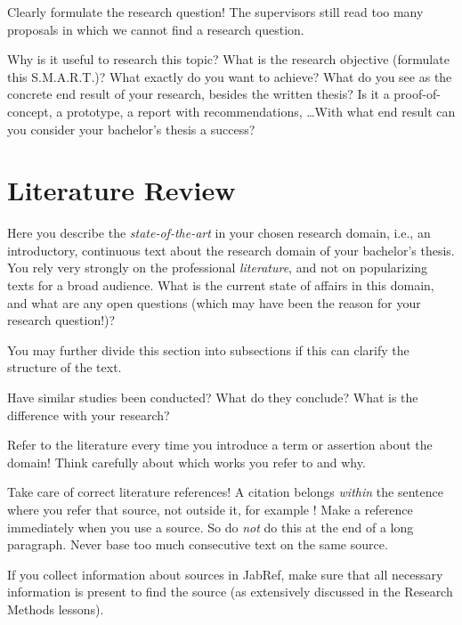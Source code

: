 \documentclass[english]{hogent-article}
\begin{document}
Clearly formulate the research question! The supervisors still read too many proposals in which we cannot find a research question.

Why is it useful to research this topic? What is the research objective (formulate this S.M.A.R.T.)? What exactly do you want to achieve? What do you see as the concrete end result of your research, besides the written thesis? Is it a proof-of-concept, a prototype, a report with recommendations, \ldots With what end result can you consider your bachelor's thesis a success?

\section{Literature Review}%
\label{sec:literature review}


Here you describe the \emph{state-of-the-art} in your chosen research domain, i.e., an introductory, continuous text about the research domain of your bachelor's thesis. You rely very strongly on the professional \emph{literature}, and not on popularizing texts for a broad audience. What is the current state of affairs in this domain, and what are any open questions (which may have been the reason for your research question!)?

You may further divide this section into subsections if this can clarify the structure of the text.

Have similar studies been conducted? What do they conclude? What is the difference with your research?

Refer to the literature every time you introduce a term or assertion about the domain! Think carefully about which works you refer to and why.

Take care of correct literature references! A citation belongs \emph{within} the sentence where you refer that source, not outside it, for example \autocite{Hykes2013}! Make a reference immediately when you use a source. So do \emph{not} do this at the end of a long paragraph. Never base too much consecutive text on the same source.

If you collect information about sources in Jab\-Ref, make sure that all necessary information is present to find the source (as extensively discussed in the Research Methods lessons).

\end{document}
